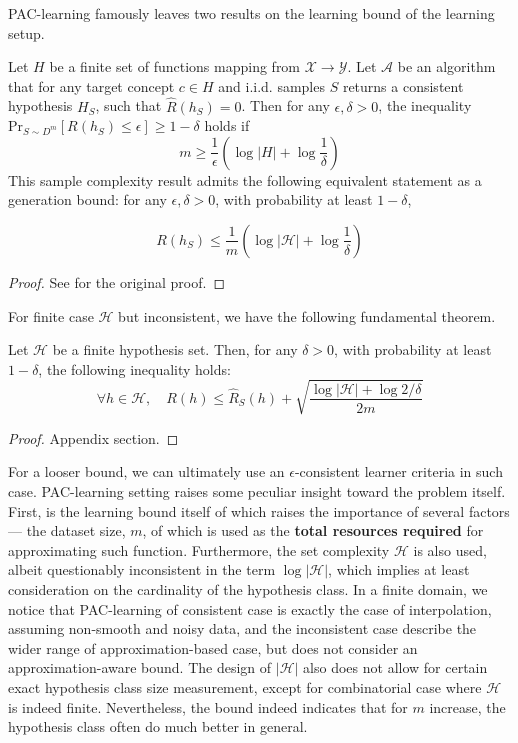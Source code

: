 \documentclass[
  journal=largetwo,
  year=2025,
  volume=37,
]{cup-journal}
\begin{document}
PAC-learning famously leaves two results on the learning bound of the learning setup. 
\begin{theorem}\label{thm:PAC_consistent}
    Let $H$ be a finite set of functions mapping from $\mathcal{X}\to \mathcal{Y}$. Let $\mathcal{A}$ be an algorithm that for any target concept $c\in H$ and i.i.d. samples $S$ returns a consistent hypothesis $H_{S}$, such that $\hat{R}(h_{S}) = 0$. Then for any  $\epsilon,\delta>0$, the inequality $\mathrm{Pr}_{S\sim D^{m}}[R(h_{S})\leq \epsilon]\geq 1-\delta$ holds if $$m\geq \frac{1}{\epsilon}\left( \log{\lvert H \rvert }+\log{\frac{1}{\delta}} \right)$$
This sample complexity result admits the following equivalent statement as a generation bound: for any $\epsilon,\delta>0$, with probability at least $1-\delta$, 

\begin{equation}
    R(h_S) \leq \frac{1}{m} \left( \log{|\mathcal{H}|} + \log{\frac{1}{\delta}} \right)
\end{equation}
\end{theorem}
\begin{proof}
    See \cite{10.5555/2371238} for the original proof.
\end{proof}
For finite case $\mathcal{H}$ but inconsistent, we have the following fundamental theorem.
\begin{theorem}\label{thm:theorem_inconsistent}
    Let $\mathcal{H}$ be a finite hypothesis set. Then, for any $\delta > 0$, with probability at least $1-\delta$, the following inequality holds: 
    \begin{equation}
        \forall h \in \mathcal{H}, \quad R(h) \leq \hat{R}_S (h) + \sqrt{\frac{\log{|\mathcal{H}|}+ \log{2/\delta}}{2m}}
    \end{equation}
\end{theorem}
\begin{proof}
    Appendix section.
\end{proof}
For a looser bound, we can ultimately use an $\epsilon$-consistent learner criteria in such case. PAC-learning setting raises some peculiar insight toward the problem itself. First, is the learning bound itself of which raises the importance of several factors --- the dataset size, $m$, of which is used as the \textbf{total resources required} for approximating such function. Furthermore, the set complexity $\mathcal{H}$ is also used, albeit questionably inconsistent in the term $\log{|\mathcal{H}|}$, which implies at least consideration on the cardinality of the hypothesis class. In a finite domain, we notice that PAC-learning of consistent case is exactly the case of interpolation, assuming non-smooth and noisy data, and the inconsistent case describe the wider range of approximation-based case, but does not consider an approximation-aware bound. The design of $|\mathcal{H}|$ also does not allow for certain exact hypothesis class size measurement, except for combinatorial case where $\mathcal{H}$ is indeed finite. Nevertheless, the bound indeed indicates that for $m$ increase, the hypothesis class often do much better in general. 
\end{document}
